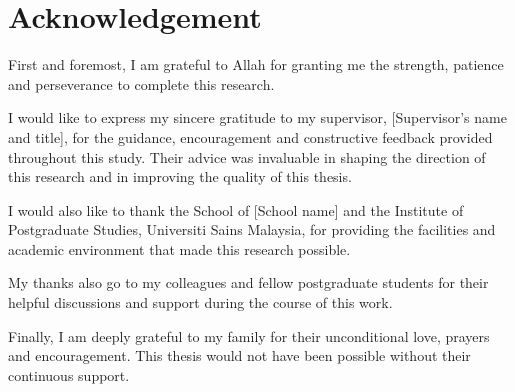 \chapter{Acknowledgement}


First and foremost, I am grateful to Allah for granting me the strength, patience and perseverance to complete this research.

I would like to express my sincere gratitude to my supervisor, [Supervisor's name and title], for the guidance, encouragement and constructive feedback provided throughout this study. Their advice was invaluable in shaping the direction of this research and in improving the quality of this thesis.

I would also like to thank the School of [School name] and the Institute of Postgraduate Studies, Universiti Sains Malaysia, for providing the facilities and academic environment that made this research possible.

My thanks also go to my colleagues and fellow postgraduate students for their helpful discussions and support during the course of this work.

Finally, I am deeply grateful to my family for their unconditional love, prayers and encouragement. This thesis would not have been possible without their continuous support.
